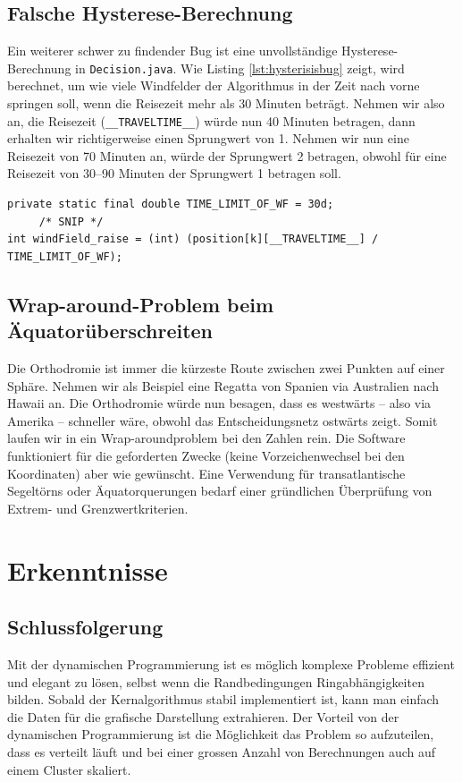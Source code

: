 \subsection{Falsche Hysterese-Berechnung}
Ein weiterer schwer zu findender Bug ist eine unvollständige
Hysterese-Berechnung in \texttt{Decision.java}. Wie Listing
\ref{lst:hysterisisbug} zeigt, wird berechnet, um wie viele Windfelder der
Algorithmus in der Zeit nach vorne springen soll, wenn die Reisezeit mehr als
30 Minuten beträgt. Nehmen wir also an, die Reisezeit
(\texttt{\_\_TRAVELTIME\_\_}) würde nun 40 Minuten betragen, dann erhalten wir
richtigerweise einen Sprungwert von 1. Nehmen wir nun eine Reisezeit von 70
Minuten an, würde der Sprungwert 2 betragen, obwohl für eine Reisezeit von
30--90 Minuten der Sprungwert 1 betragen soll.
\begin{lstlisting}[caption={Hystereseberechnung in Decision.java},label=lst:hysterisisbug]
private static final double TIME_LIMIT_OF_WF = 30d;
     /* SNIP */
int windField_raise = (int) (position[k][__TRAVELTIME__] / TIME_LIMIT_OF_WF);
\end{lstlisting}

\subsection{Wrap-around-Problem beim Äquatorüberschreiten}
Die Orthodromie ist immer die kürzeste Route zwischen zwei Punkten auf einer
Sphäre. Nehmen wir als Beispiel eine Regatta von Spanien via Australien nach
Hawaii an. Die Orthodromie würde nun besagen, dass es westwärts -- also via
Amerika -- schneller wäre, obwohl das Entscheidungsnetz ostwärts zeigt. Somit
laufen wir in ein Wrap-aroundproblem bei den Zahlen rein. Die Software
funktioniert für die geforderten Zwecke (keine Vorzeichenwechsel bei den
Koordinaten) aber wie gewünscht. Eine Verwendung für transatlantische
Segeltörns oder Äquatorquerungen bedarf einer gründlichen Überprüfung von
Extrem- und Grenzwertkriterien.

\clearpage

\section{Erkenntnisse}
\subsection{Schlussfolgerung}
Mit der dynamischen Programmierung ist es möglich komplexe Probleme effizient
und elegant zu lösen, selbst wenn die Randbedingungen Ringabhängigkeiten
bilden. Sobald der Kernalgorithmus stabil implementiert ist, kann man einfach
die Daten für die grafische Darstellung extrahieren. Der Vorteil von der
dynamischen Programmierung ist die Möglichkeit das Problem so aufzuteilen,
dass es verteilt läuft und bei einer grossen Anzahl von Berechnungen auch auf
einem Cluster skaliert.

